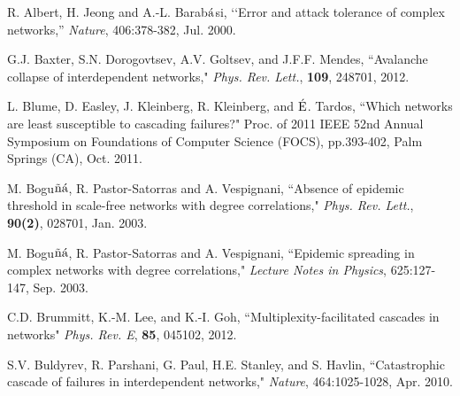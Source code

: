 \documentclass[10pt, journal, compsoc]{IEEEtran}
\begin{document}
\begin{thebibliography}{1}

R. Albert, H. Jeong and A.-L. Barab$\acute{\rm a}$si, 
\lq \lq Error and attack tolerance of complex networks,''
{\em Nature}, 406:378-382, Jul. 2000. 

G.J. Baxter, S.N. Dorogovtsev, A.V. Goltsev, and 
	J.F.F. Mendes, 
``Avalanche collapse of interdependent networks,"
{\em Phys. Rev. Lett.}, {\bf 109}, 248701, 2012. 


L. Blume, D. Easley, J. Kleinberg, R. Kleinberg, and
	$\acute{\rm{E}}$. Tardos, 
``Which networks are least susceptible to cascading
	failures?"
Proc. of 2011 IEEE 52nd Annual Symposium on 
	Foundations of Computer Science (FOCS), pp.393-402, 
	Palm Springs (CA), Oct. 2011. 

M. Bogu${\tilde{\rm n}}{\acute{\rm a}}$, R. Pastor-Satorras
and A. Vespignani, 
``Absence of epidemic threshold in scale-free networks with 
	degree correlations,"
{\em Phys. Rev. Lett.}, {\bf 90(2)}, 028701, Jan. 2003.

M. Bogu${\tilde{\rm n}}{\acute{\rm a}}$, R. Pastor-Satorras
and A. Vespignani, 
``Epidemic spreading in complex networks with degree 
	correlations,"
{\em Lecture Notes in Physics}, 625:127-147, Sep. 2003.


C.D. Brummitt, K.-M. Lee, and K.-I. Goh,
``Multiplexity-facilitated cascades in networks"
{\em Phys. Rev. E}, {\bf 85}, 045102, 2012. 

S.V. Buldyrev, R. Parshani, G. Paul, H.E. Stanley, and S. Havlin, 
``Catastrophic cascade of failures in interdependent networks,"
{\em Nature}, 464:1025-1028, Apr. 2010. 

%
 

\end{thebibliography}
\end{document}
